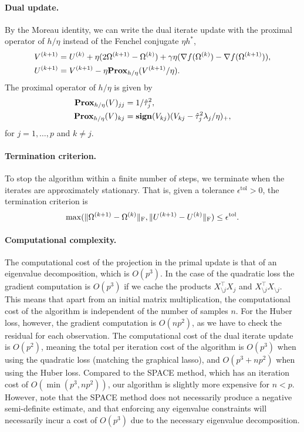 \documentclass{article}
\begin{document}
\paragraph{Dual update.} By the Moreau identity, we can write the dual iterate
update with the proximal operator of $h / \eta$ instead of the Fenchel
conjugate $\eta h^*$,
\begin{align*}
    V^{(k+1)} &= U^{(k)} + \eta (2 \Omega^{(k+1)} - \Omega^{(k)}) + \gamma\eta(\nabla f(\Omega^{(k)}) - \nabla f(\Omega^{(k+1)})), \\
    U^{(k+1)} &= V^{(k+1)} - \eta \mathbf{Prox}_{h / \eta}(V^{(k+1)} / \eta).
\end{align*}
The proximal operator of $h / \eta$ is given by 
\[
\begin{aligned}
    \mathbf{Prox}_{h / \eta}(V)_{jj} &= 1 / \hat\tau_j^2, \\
    \mathbf{Prox}_{h / \eta}(V)_{kj} &= \mathop{\bf sign}(V_{kj})(V_{kj} - \hat\tau_j^2 \lambda_j / \eta)_+,
\end{aligned}
\]
for $j = 1, \dots, p$ and $k \neq j$.

\paragraph{Termination criterion.} To stop the algorithm within a finite number
of steps, we terminate when the iterates are approximately stationary. That is,
given a tolerance $\epsilon^\text{tol} > 0$, the termination criterion is
\[
    \max(\|\Omega^{(k+1)} - \Omega^{(k)}\|_{\rm F}, \|U^{(k+1)} - U^{(k)}\|_{\rm F}) \leq \epsilon^\text{tol}.
\]

\paragraph{Computational complexity.} The computational cost of the projection
in the primal update is that of an eigenvalue decomposition, which is $O(p^3)$.
In the case of the quadratic loss the gradient computation is $O(p^3)$ if we
cache the products $X_{\setminus j}^\top X_j$ and $X_{\setminus j}^\top
X_{\setminus j}$. This means that apart from an initial matrix multiplication,
the computational cost of the algorithm is independent of the number of samples
$n$. For the Huber loss, however, the gradient computation is $O(np^2)$, as we
have to check the residual for each observation. The computational cost of the
dual iterate update is $O(p^2)$, meaning the total per iteration cost of the
algorithm is $O(p^3)$ when using the quadratic loss (matching the graphical
lasso), and $O(p^3 + np^2)$ when using the Huber loss. Compared to the SPACE
method, which has an iteration cost of $O(\min(p^3, np^2))$, our algorithm is
slightly more expensive for $n < p$. However, note that the SPACE method does
not necessarily produce a negative semi-definite estimate, and that enforcing
any eigenvalue constraints will necessarily incur a cost of $O(p^3)$ due to the
necessary eigenvalue decomposition.
\end{document}
